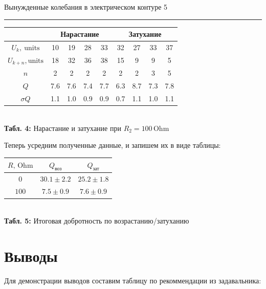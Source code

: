 \documentclass[12pt,a4paper]{scrartcl}
\begin{document}
	\newpage
	
	
	\begin{flushleft}
		\footnotesize{Вынужденные колебания в электрическом контуре} \hspace{\fill} \footnotesize{5}
		\\[-0.3cm]\noindent\rule{\textwidth}{0.3pt}
	\end{flushleft}
	
	\begin{center}
		\begin{tabular}{|c|c|c|c|c|c|c|c|c|}  \hline
			{} & \multicolumn{4}{|c|}{Нарастание} & \multicolumn{4}{|c|}{Затухание} \\\hline
			$U_k,\ \text{units}$ & 10 & 19 & 28 & 33 & 32 & 27 & 33 & 37 \\\hline
			$U_{k+n}, \text{units}$ & 18 & 32 & 36 & 38 & 15 & 9 & 9 & 5 \\\hline
			$n$ & 2 & 2 & 2 & 2 & 2 & 2 & 3 & 5 \\\hline
			$Q$ & 7.6 & 7.6 & 7.4 & 7.7 & 6.3 & 8.7 & 7.3 & 7.8 \\\hline
			$\sigma Q$ & 1.1 & 1.0 & 0.9 & 0.9 & 0.7 & 1.1 & 1.0 & 1.1 \\\hline
		\end{tabular}
		\\\textbf{Табл. 4:} Нарастание и затухание при $R_2 = 100\, \mathrm{Ohm}$
	\end{center}

	Теперь усредним полученные данные, и запишем их в виде таблицы:
	
	\begin{center}
		\begin{tabular}{|c|c|c|} \hline
			$R,\, \mathrm{Ohm}$ & $Q_\text{воз}$ & $Q_\text{зат}$ \\\hline
			$0$ & $30.1 \pm 2.2$ & $25.2 \pm 1.8$ \\\hline
			$100$ & $7.5 \pm 0.9$ & $7.6 \pm 0.9$ \\\hline 
		\end{tabular}
		\\\textbf{Табл. 5:} Итоговая добротность по возрастанию/затуханию
	\end{center}
	
	\section{Выводы}
	
	Для демонстрации выводов составим таблицу по рекоммендации из задавальника:
	
\end{document}
